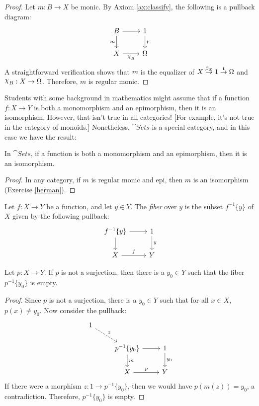 \begin{proof} Let $m:B\to X$ be monic.  By Axiom \ref{ax:classify},
  the following is a pullback diagram:
  \[ \begin{tikzcd}
    B \arrow[d,"m"'] \arrow{r} & 1 \arrow{d}{t} \\
    X \arrow[r,"\ch{B}"'] & \Omega \end{tikzcd} \] A straightforward
  verification shows that $m$ is the equalizer of $X\stackrel{\beta
    _X}{\to} 1\stackrel{\mathsf{t}}{\to}\Omega$ and $\ch{B}:X\to\Omega$.
  Therefore, $m$ is regular monic.
\end{proof}

Students with some background in mathematics might assume that if a
function $f:X\to Y$ is both a monomorphism and an epimorphism, then it
is an isomorphism.  However, that isn't true in all categories!  [For
example, it's not true in the category of monoids.]  Nonetheless,
$\cat{Sets}$ is a special category, and in this case we have the
result:

\begin{prop} In $\cat{Sets}$, if a function is both a monomorphism and
  an epimorphism, then it is an
  isomorphism. \label{sets:balanced} \end{prop}

\begin{proof} In any category, if $m$ is regular monic and epi, then
  $m$ is an isomorphism (Exercise \ref{herman}). \end{proof}

\begin{defn} Let $f:X\to Y$ be a function, and let $y\in Y$.  The
  \emph{fiber} over $y$ is the subset $f^{-1}\{ y\}$ of $X$ given by
  the following pullback:
  \[ \begin{tikzcd} f^{-1}\{ y\} \arrow[d] \arrow[r] & 1 \arrow[d,"y"] \\
    X \arrow[r,"f"] & Y \end{tikzcd} \] \end{defn}


\begin{prop} Let $p:X\to Y$.  If $p$ is not a surjection, then there
  is a $y_0\in Y$ such that the fiber $p^{-1}\{ y_0\}$ is
  empty. \label{empty-fiber} \end{prop}

\begin{proof} Since $p$ is not a surjection, there is a $y_0\in Y$
  such that for all $x\in X$, $p(x)\neq y_0$.  Now consider the
  pullback:
\[ \begin{tikzcd} 
1 \arrow[dashed]{rd}{z} \\
& {p^{-1}\{ y_0 \}} \arrow{d}{m} \arrow{r} &  1 \arrow{d}{y_0} \\
& X \arrow{r}{p}  & Y 
\end{tikzcd} \] If there were a morphism $z:1\to p^{-1}\{ y_0\}$, then
we would have $p(m(z))=y_0$, a contradiction.  Therefore, $p^{-1}\{
y_0\}$ is empty.
\end{proof}

